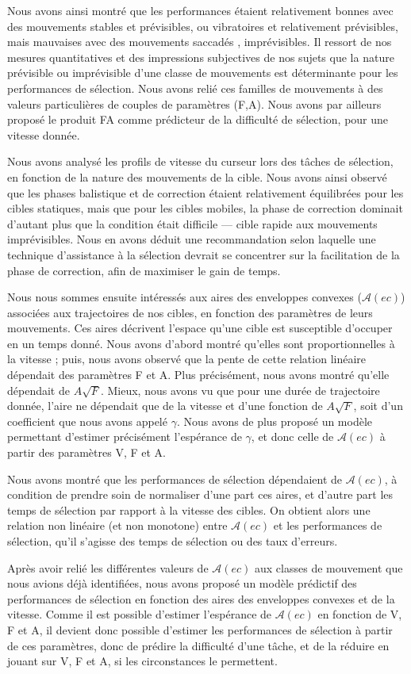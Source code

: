	Nous avons ainsi montré que les performances étaient relativement bonnes avec des mouvements \og stables \fg{} et prévisibles, ou \og vibratoires \fg{} et relativement prévisibles, mais mauvaises avec des mouvements \og saccadés \fg{}, imprévisibles. Il ressort de nos mesures quantitatives et des impressions subjectives de nos sujets que la nature prévisible ou imprévisible d'une classe de mouvements est déterminante pour les performances de sélection. Nous avons relié ces familles de mouvements à des valeurs particulières de couples de paramètres (F,A). Nous avons par ailleurs proposé le produit FA comme prédicteur de la difficulté de sélection, pour une vitesse donnée.
	
	Nous avons analysé les profils de vitesse du curseur lors des tâches de sélection, en fonction de la nature des mouvements de la cible. Nous avons ainsi observé que les phases balistique et de correction étaient relativement équilibrées pour les cibles statiques, mais que pour les cibles mobiles, la phase de correction dominait d'autant plus que la condition était difficile --- cible rapide aux mouvements imprévisibles. Nous en avons déduit une recommandation selon laquelle une technique d'assistance à la sélection devrait se concentrer sur la facilitation de la phase de correction, afin de maximiser le gain de temps.
	
	Nous nous sommes ensuite intéressés aux aires des enveloppes convexes ($\mathcal{A}(ec)$) associées aux trajectoires de nos cibles, en fonction des paramètres de leurs mouvements. Ces aires décrivent l'espace qu'une cible est susceptible d'occuper en un temps donné. Nous avons d'abord montré qu'elles sont proportionnelles à la vitesse ; puis, nous avons observé que la pente de cette relation linéaire dépendait des paramètres F et A. Plus précisément, nous avons montré qu'elle dépendait de $A\sqrt{F}$. Mieux, nous avons vu que pour une durée de trajectoire donnée, l'aire ne dépendait que de la vitesse et d'une fonction de $A\sqrt{F}$, soit d'un coefficient que nous avons appelé $\gamma$. Nous avons de plus proposé un modèle permettant d'estimer précisément l'espérance de $\gamma$, et donc celle de $\mathcal{A}(ec)$ à partir des paramètres V, F et A.
	
	Nous avons montré que les performances de sélection dépendaient de $\mathcal{A}(ec)$, à condition de prendre soin de normaliser d'une part ces aires, et d'autre part les temps de sélection par rapport à la vitesse des cibles. On obtient alors une relation non linéaire (et non monotone) entre $\mathcal{A}(ec)$ et les performances de sélection, qu'il s'agisse des temps de sélection ou des taux d'erreurs.
	
	Après avoir relié les différentes valeurs de $\mathcal{A}(ec)$ aux classes de mouvement que nous avions déjà identifiées, nous avons proposé un modèle prédictif des performances de sélection en fonction des aires des enveloppes convexes et de la vitesse. Comme il est possible d'estimer l'espérance de $\mathcal{A}(ec)$ en fonction de V, F et A, il devient donc possible d'estimer les performances de sélection à partir de ces paramètres, donc de prédire la difficulté d'une tâche, et de la réduire en jouant sur V, F et A, si les circonstances le permettent.

\clearpage
